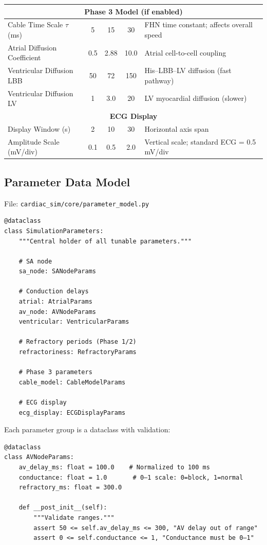 \documentclass[12pt,a4paper,oneside]{book}
\begin{document}
\begin{center}
\begin{longtable}{|l|c|c|c|p{3cm}|}
\hline
\multicolumn{5}{|c|}{\textbf{Phase 3 Model (if enabled)}} \\
\hline
Cable Time Scale $\tau$ (ms) & 5 & 15 & 30 & FHN time constant; affects overall speed \\
\hline
Atrial Diffusion Coefficient & 0.5 & 2.88 & 10.0 & Atrial cell-to-cell coupling \\
\hline
Ventricular Diffusion LBB & 50 & 72 & 150 & His–LBB–LV diffusion (fast pathway) \\
\hline
Ventricular Diffusion LV & 1 & 3.0 & 20 & LV myocardial diffusion (slower) \\
\hline
\multicolumn{5}{|c|}{\textbf{ECG Display}} \\
\hline
Display Window (s) & 2 & 10 & 30 & Horizontal axis span \\
\hline
Amplitude Scale (mV/div) & 0.1 & 0.5 & 2.0 & Vertical scale; standard ECG = 0.5 mV/div \\
\hline

\end{longtable}
\end{center}

\subsection{Parameter Data Model}

File: \texttt{cardiac\_sim/core/parameter\_model.py}

\begin{Verbatim}[formatcom=\color{black}]
@dataclass
class SimulationParameters:
    """Central holder of all tunable parameters."""
    
    # SA node
    sa_node: SANodeParams
    
    # Conduction delays
    atrial: AtrialParams
    av_node: AVNodeParams
    ventricular: VentricularParams
    
    # Refractory periods (Phase 1/2)
    refractoriness: RefractoryParams
    
    # Phase 3 parameters
    cable_model: CableModelParams
    
    # ECG display
    ecg_display: ECGDisplayParams
\end{Verbatim}

Each parameter group is a dataclass with validation:

\begin{Verbatim}[formatcom=\color{black}]
@dataclass
class AVNodeParams:
    av_delay_ms: float = 100.0    # Normalized to 100 ms
    conductance: float = 1.0       # 0–1 scale: 0=block, 1=normal
    refractory_ms: float = 300.0
    
    def __post_init__(self):
        """Validate ranges."""
        assert 50 <= self.av_delay_ms <= 300, "AV delay out of range"
        assert 0 <= self.conductance <= 1, "Conductance must be 0–1"
\end{Verbatim}
\end{document}
